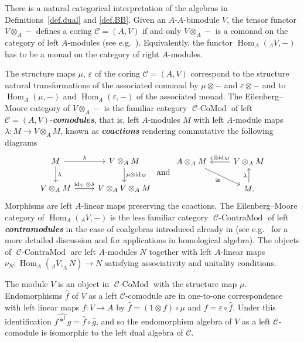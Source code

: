 \documentclass[12pt,a4paper]{amsart}
\theoremstyle{plain}
\theoremstyle{definition}
\numberwithin{equation}{thm}
\newcommand{\emphbf}[1]{\emph{\textbf{#1}}}
\DeclareMathOperator{\id}{id}
\DeclareMathOperator{\Hom}{Hom}
\DeclareMathOperator{\CCoMod}{\mathcal{C}-CoMod}
\DeclareMathOperator{\CContraMod}{\mathcal{C}-ContraMod}
\begin{document}
There is a natural categorical interpretation of the algebras in Definitions~\ref{def.dual} and \ref{def.BB}. Given an $A$-$A$-bimodule $V$, the tensor functor $V\otimes_A -$ defines a coring $\mathcal{C}=(A,V)$ if and only $V\otimes_A -$ is a comonad on the category of left $A$-modules (see e.g.\ \cite{BBW09}). Equivalently, the functor $\Hom_A ({}_AV,-)$ has to be a monad on the category of right $A$-modules.



The structure maps $\mu$, $\varepsilon$ of the coring $\mathcal{C}=(A,V)$ correspond to the structure natural transformations of the associated comonad by  $\mu\otimes -$ and $ \varepsilon\otimes -$ and to $\Hom_A(\mu,-)$ and $\Hom_A(\varepsilon,-)$ of the associated monad. The Eilenberg--Moore category of $V\otimes_A-$ is the familiar category $\CCoMod$  of left $\mathcal{C} = (A,V)$-\emphbf{comodules}, that is, left $A$-modules $M$ with left $A$-module maps $\lambda\colon M\to V\otimes_A M$, known as {\emphbf{coactions}} rendering commutative the following diagrams
\[\begin{tikzcd}
M\arrow{r}{\lambda}\arrow{d}{\lambda} &V\otimes_A M\arrow{d}{\mu\otimes \id_M}\\
V\otimes_A M\arrow{r}{\id_V\otimes \lambda} &V\otimes_AV\otimes_A M
\end{tikzcd} \text{ and } 
\begin{tikzcd}
  A\otimes_A M\arrow{dr}[swap]{\cong} &V\otimes_A M\arrow{l}[swap]{
    \varepsilon \otimes \id_M} \\ &M\arrow{u}{\lambda} .
\end{tikzcd}
\]
Morphisms are left $A$-linear maps preserving the coactions. The Eilenberg--Moore category of $\Hom_A ({}_AV,-)$ is the less familiar category $\CContraMod$ of left {\emphbf {contramodules}} in the case of coalgebras introduced already in \cite{EM65b} (see e.g.\ \cite{BBW09} for a more detailed discussion and \cite{Pos10} for applications in homological algebra). The objects of $\CContraMod$ are left $A$-modules $N$ together with left $A$-linear maps $\nu_N\colon \Hom_A(_AV,_AN)\to N$ satisfying associativity and unitality conditions. 

The module $V$ is an object in $\CCoMod$ with the structure map $\mu$. Endomorphisms $\hat f$ of $V$ as a left $\mathcal{C}$-comodule are in one-to-one correspondence with left linear maps $f\colon V\to A$ by $\hat f = (1\otimes f)\circ \mu$ and $f = \varepsilon\circ \hat f$. Under this identification $\widehat{f *^lg} = \hat f\circ\hat g$, and so the endomorphism algebra of $V$ as a left $\mathcal{C}$-comodule is isomorphic to the left dual algebra of $\mathcal{C}$. 
\end{document}
